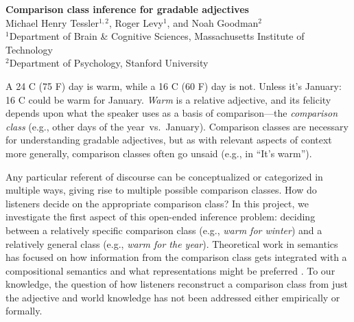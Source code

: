 \documentclass[letterpaper, 12pt]{article}
\begin{document}
\begin{center}
\textbf{Comparison class inference for gradable adjectives} \\
Michael Henry Tessler$^{1,2}$, Roger Levy$^1$, and Noah Goodman$^2$ \\
$^1$Department of Brain \& Cognitive Sciences, Massachusetts Institute of Technology \\
$^2$Department of Psychology, Stanford University
\end{center}

A 24 \degree C  (75 \degree F) day is warm, while a 16 \degree C  (60 \degree F) day is not. Unless it's January: 16 \degree C  could be warm for January.
\emph{Warm} is a relative adjective, and its felicity depends upon what the speaker uses as a basis of comparison---the \emph{comparison class} (e.g., other days of the year~vs.~January).
Comparison classes are necessary for understanding gradable adjectives, but as with relevant aspects of context more generally, comparison classes often go unsaid (e.g., in ``It's warm'').


Any particular referent of discourse can be conceptualized or categorized in multiple ways, giving rise to multiple possible comparison classes.
How do listeners decide on the appropriate comparison class? 
In this project, we investigate the first aspect of this open-ended inference problem: deciding between a relatively specific comparison class (e.g., \emph{warm for winter}) and a relatively general class (e.g., \emph{warm for the year}).
Theoretical work in semantics has focused on how information from the comparison class gets integrated with a compositional semantics and what representations might be preferred \cite{Bale2011, Solt2009}. 
To our knowledge, the question of how listeners reconstruct a comparison class from just the adjective and world knowledge has not been addressed either empirically or  formally.
\end{document}
